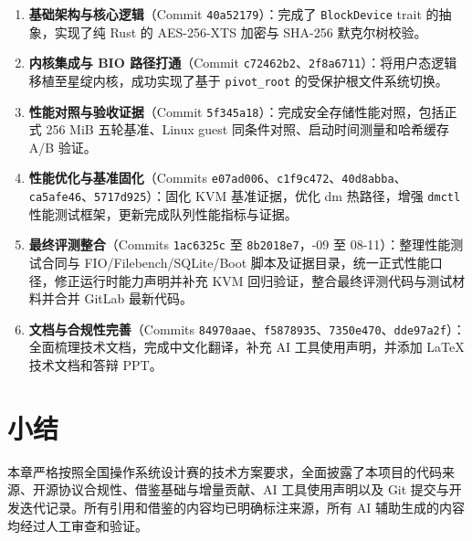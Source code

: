 \begin{enumerate}
    \item \textbf{基础架构与核心逻辑}（Commit \texttt{40a52179}）：完成了 \texttt{BlockDevice} trait 的抽象，实现了纯 Rust 的 AES-256-XTS 加密与 SHA-256 默克尔树校验。
    \item \textbf{内核集成与 BIO 路径打通}（Commit \texttt{c72462b2}、\texttt{2f8a6711}）：将用户态逻辑移植至星绽内核，成功实现了基于 \texttt{pivot\_root} 的受保护根文件系统切换。
    \item \textbf{性能对照与验收证据}（Commit \texttt{5f345a18}）：完成安全存储性能对照，包括正式 256 MiB 五轮基准、Linux guest 同条件对照、启动时间测量和哈希缓存 A/B 验证。
    \item \textbf{性能优化与基准固化}（Commits \texttt{e07ad006}、\allowbreak \texttt{c1f9c472}、\allowbreak \texttt{40d8abba}、\allowbreak \texttt{ca5afe46}、\allowbreak \texttt{5717d925}）：固化 KVM 基准证据，优化 dm 热路径，增强 \texttt{dmctl} 性能测试框架，更新完成队列性能指标与证据。
    \item \textbf{最终评测整合}（Commits \texttt{1ac6325c} 至 \texttt{8b2018e7}，-09 至 08-11）：整理性能测试合同与 FIO/Filebench/SQLite/Boot 脚本及证据目录，统一正式性能口径，修正运行时能力声明并补充 KVM 回归验证，整合最终评测代码与测试材料并合并 GitLab 最新代码。
    \item \textbf{文档与合规性完善}（Commits \texttt{84970aae}、\allowbreak \texttt{f5878935}、\allowbreak \texttt{7350e470}、\allowbreak \texttt{dde97a2f}）：全面梳理技术文档，完成中文化翻译，补充 AI 工具使用声明，并添加 LaTeX 技术文档和答辩 PPT。
\end{enumerate}

\section{小结}

本章严格按照全国操作系统设计赛的技术方案要求，全面披露了本项目的代码来源、开源协议合规性、借鉴基础与增量贡献、AI 工具使用声明以及 Git 提交与开发迭代记录。所有引用和借鉴的内容均已明确标注来源，所有 AI 辅助生成的内容均经过人工审查和验证。